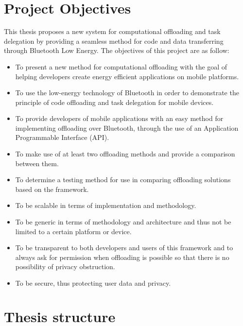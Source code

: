 \section{Project Objectives}
\label{objectives}

This thesis proposes a new system for computational offloading and task delegation by providing a seamless method for code and data transferring through Bluetooth Low Energy. The objectives of this project are as follow:

\begin{itemize}

\item{To present a new method for computational offloading with the goal of helping developers create energy efficient applications on mobile platforms.}

\item{To use the low-energy technology of Bluetooth in order to demonstrate the principle of code offloading and task delegation for mobile devices.}

\item{To provide developers of mobile applications with an easy method for implementing offloading over Bluetooth, through the use of an Application Programmable Interface (API).}

\item{To make use of at least two offloading methods and provide a comparison between them.}

\item{To determine a testing method for use in comparing offloading solutions based on the framework.}

\item{To be scalable in terms of implementation and methodology.}

\item{To be generic in terms of methodology and architecture and thus not be limited to a certain platform or device.}

\item{To be transparent to both developers and users of this framework and to always ask for permission when offloading is possible so that there is no possibility of privacy obstruction.}

\item{To be secure, thus protecting user data and privacy.}

\end{itemize}

\section{Thesis structure}

